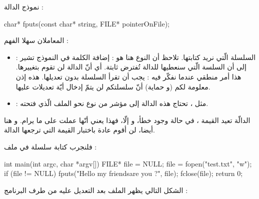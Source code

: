 نموذج الدالة :

\begin{Csource}
char* fputs(const char* string, FILE* pointerOnFile);
\end{Csource}

المعاملان سهلا الفهم :
\begin{itemize}
  \item {} :
السلسلة الّتي نريد كتابتها. تلاحظ أن النوع هنا هو
 :
إضافة الكلمة
في النموذج تشير إلى أن السلسة الّتي سنعطيها للدالة تُفترض ثابتة. أي أنّ الدالة لن تقوم بتغييرها. هذا أمر منطقي عندما نفكّر فيه :
يجب أن تقرأ السلسلة بدون تعديلها. هذه إذن معلومة لكم (و حماية) أنّ سلسلتكم لن يتمّ إدخال أيّة تعديلات عليها.
  \item {} :
 مثل
،
 تحتاج هذه الدالة إلى مؤشر من نوع
نحو الملف الّذي فتحته.
\end{itemize}

الدالّة تعيد القيمة
،
في حالة وجود خطأ، و إلّا، فهذا يعني أنّها عملت على ما يرام. و هنا أيضا، لن أقوم عادة باختبار القيمة التي ترجعها الدالة.

فلنجرب كتابة سلسلة في ملف :

\begin{Csource}
int main(int argc, char *argv[])
{
	FILE* file = NULL;
	file = fopen("test.txt", "w");
	if (file != NULL)
	{
    	 	fputs("Hello my friends\nHow are you ?", file);
    	 	fclose(file);
	}
	return 0;
}
\end{Csource}

الشكل التالي يظهر الملف بعد التعديل عليه من طرف البرنامج :

